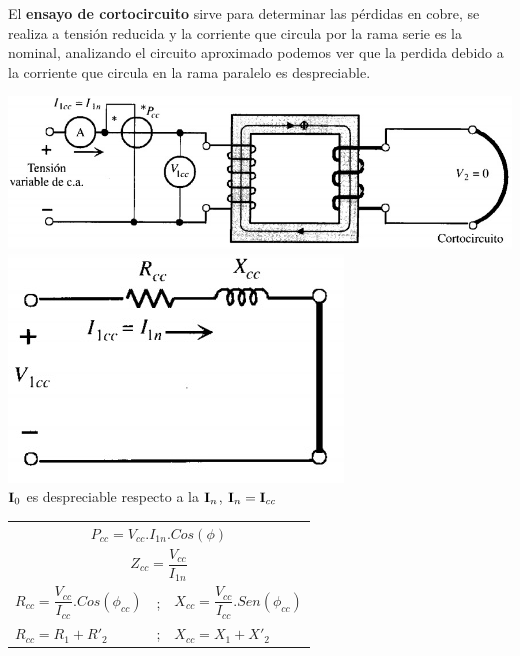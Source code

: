\documentclass[11pt,a4paper]{article}
\newcommand{\fasor}[1]{\uppercase{\textbf{#1}}}
\begin{document}
\begin{cajita}
\begin{flushleft}
		El \textbf{ensayo de cortocircuito} sirve para determinar las pérdidas en cobre, se realiza a tensión reducida y la corriente que circula por la rama serie es la nominal, analizando el circuito aproximado podemos ver que la perdida debido a la corriente que circula en la rama paralelo es despreciable. 
			\begin{multicols}{2}
			\includegraphics[width=0.9\linewidth]{ensayo-cc-1}\\
			\includegraphics[width=.4\linewidth]{ensayo-cc-2}\\
			
			\columnbreak
				$\fasor{I}_{0}$ es despreciable respecto a la $\fasor{I}_{n}$, $\fasor{I}_{n}=\fasor{I}_{cc}$\\
			\vspace*{0.3cm}
			\begin{tabular}{l c l}
				\multicolumn{3}{c}{$P_{cc}=V_{cc}.I_{1n}.Cos(\phi)$}\\[0.1cm]
				\multicolumn{3}{c}{$Z_{cc}=\dfrac{V_{cc}}{I_{1n}}$}\\[0.2cm]
				$ R_{cc}=\dfrac{V_{cc}}{I_{cc}}.Cos(\phi_{cc}) $& ; &$X_{cc}=\dfrac{V_{cc}}{I_{cc}}.Sen(\phi_{cc})$\\[0.4cm]			$ R_{cc}=R_{1}+R'_{2} $& ; &$X_{cc}=X_{1}+X'_{2}$\\[0.4cm]
				
			\end{tabular}
			
		\end{multicols}

	\end{flushleft}
	

\end{cajita}
\end{document}
